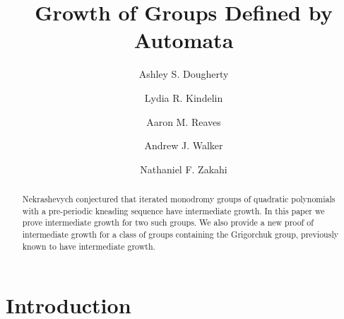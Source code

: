 \documentclass[11pt]{amsart}
\theoremstyle{definition}
\theoremstyle{remark}
\numberwithin{equation}{section}
\begin{document}
\title[Growth of Groups Defined by Automata]{Growth of Groups Defined by Automata}


\author{Ashley S. Dougherty}
\address{ 
	(Dougherty)
	Department of Education,
	Department of Mathematics,
  Kutztown University
	Kutztown, PA 19530
	gffadougherty@yahoo.com
	}

\author{Lydia R. Kindelin}
\address{
        (Kindelin)
        Department of Mathematics,
        University of Dayton,
        Dayton, OH 45302
        kindelinl1@notes.udayton.edu 
         }

\author{Aaron M. Reaves}
\address{
	(Reaves)
	Department of Mathematics,
	Morehouse College,
	Atlanta, GA 30314
	reavesam@gmail.com
	}
	
\author{Andrew J. Walker}
\address{
        (Walker)
        Department of Physical Sciences,
        York College of Pennsylvania,
        York, PA 17403
        awalker6@ycp.edu 
        }

\author{Nathaniel F. Zakahi}
\address{
	(Zakahi)
        Department of Mathematics and Computer Science,
        Denison University,
        Granville, OH 43023
        zakahi\_n@denison.edu
	}




\begin{abstract}
Nekrashevych conjectured that iterated monodromy groups of quadratic polynomials with a pre-periodic kneading sequence have intermediate growth. In this paper we prove intermediate growth for two such groups. We also provide a new proof of intermediate growth for a class of groups containing the Grigorchuk group, previously known to have intermediate growth.
\end{abstract}



\maketitle{}



\section{Introduction}
\end{document}
